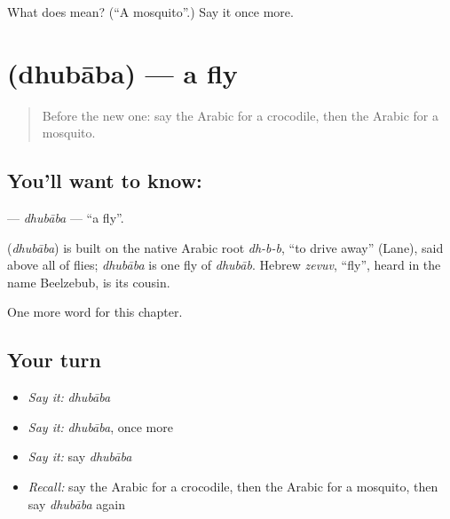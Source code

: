 \begin{tcolorbox}[breakable,colback=teal!4,colframe=teal!35!black,title={Before you move on}]
What does  mean? (\textquotedblleft{}A mosquito\textquotedblright{}.) Say it once more.
\end{tcolorbox}
\section[\texorpdfstring{\ar{ذبابة} (dhubāba)}{ذبابة (dhubāba)}]{ (dhubāba) — a fly}

\label{lesson:AR-C136-dhubaba}



\begin{quote}
Before the new one: say the Arabic for a crocodile, then the Arabic for a mosquito.
\end{quote}

\subsection*{You'll want to know: }
\textbf{} — \emph{dhubāba} — \textquotedblleft{}a fly\textquotedblright{}.

\begin{cousinweb}
\textbf{} (\emph{dhubāba}) is built on the native Arabic root \emph{dh-b-b}, \textquotedblleft{}to drive away\textquotedblright{} (Lane), said above all of flies; \emph{dhubāba} is one fly of \emph{dhubāb}. Hebrew \emph{zevuv}, \textquotedblleft{}fly\textquotedblright{}, heard in the name Beelzebub, is its cousin.
\end{cousinweb}

\begin{grammarlens}[title={What you've built}]
One more word for this chapter.
\end{grammarlens}

\subsection*{Your turn}
\begin{itemize}
\raggedright
  \item \emph{Say it:} \emph{dhubāba}
  \item \emph{Say it:} \emph{dhubāba}, once more
  \item \emph{Say it:} say \emph{dhubāba}
  \item \emph{Recall:} say the Arabic for a crocodile, then the Arabic for a mosquito, then say \emph{dhubāba} again
\end{itemize}

